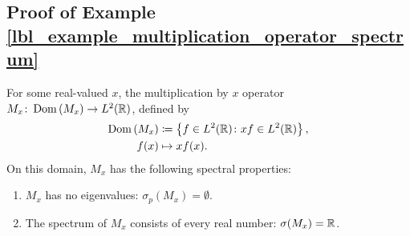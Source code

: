 \subsection{Proof of Example \eqref{lbl_example_multiplication_operator_spectrum}}\label{proof_lbl_example_multiplication_operator_spectrum}

\begin{example}
  For some real-valued $x$, the multiplication by $x$ operator $M_x \colon \operatorname{Dom}\left(M_x\right) \to L^2(\mathbb{R})$, defined by
  \begin{align*}
    \operatorname{Dom}\left(M_x\right) &\coloneqq  \left\{f \in L^2(\mathbb{R}) \colon xf \in L^2(\mathbb{R})\right\}, \\
    f(x) &\mapsto xf(x).
  \end{align*}
  On this domain, $M_x$ has the following spectral properties:
  \begin{enumerate}[label = (\alph*)]
    \item $M_x$ has no eigenvalues: $\sigma_p(M_x) = \emptyset$.
    \item The spectrum of $M_x$ consists of every real number: $\sigma(M_x) = \mathbb{R}$.
  \end{enumerate}
\end{example}
